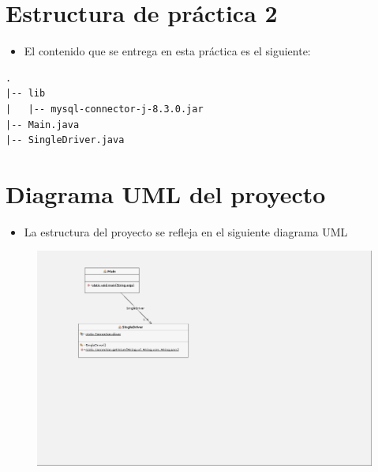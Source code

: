 \documentclass{article}
\begin{document}
    
\clearpage
	\section{Estructura de práctica 2}


	\begin{itemize}	
		\item El contenido que se entrega en esta práctica es el siguiente:
	\end{itemize}
	
\begin{lstlisting}[style=ascii-tree]
.
|-- lib
|   |-- mysql-connector-j-8.3.0.jar
|-- Main.java
|-- SingleDriver.java
\end{lstlisting}    




\clearpage
  \section{Diagrama UML del proyecto}
    \begin{itemize}	
      \item La estructura del proyecto se refleja en el siguiente diagrama UML
    \end{itemize}
    \begin{figure}[H]
      \centering
      \includegraphics[width=\textwidth]{img/a.png} 
    \end{figure}
\end{document}
